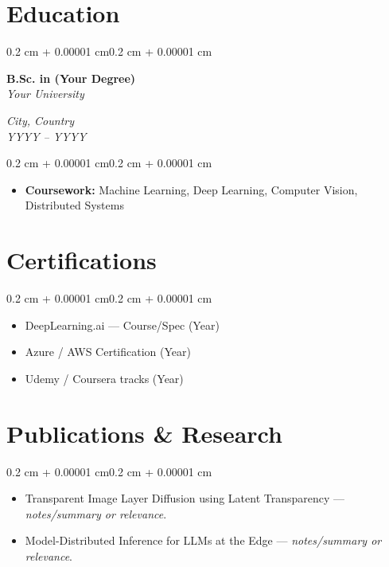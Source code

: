 \documentclass[10pt, letterpaper]{article}
\newenvironment{highlights}{
  \begin{itemize}[
    topsep=0.10 cm,
    parsep=0.10 cm,
    partopsep=0pt,
    itemsep=0pt,
    leftmargin=0.4 cm + 10pt
  ]}
  {\end{itemize}
}
\newenvironment{highlightsforbulletentries}{
  \begin{itemize}[
    topsep=0.10 cm,
    parsep=0.10 cm,
    partopsep=0pt,
    itemsep=0pt,
    leftmargin=10pt
  ]}
  {\end{itemize}
}
\newenvironment{onecolentry}{
  \begin{adjustwidth}{0.2 cm + 0.00001 cm}{0.2 cm + 0.00001 cm}
}{
  \end{adjustwidth}
}
\newenvironment{twocolentry}[2][]{
  \onecolentry
  \def\secondColumn{#2}
  \setcolumnwidth{\fill, 4.5 cm}
  \begin{paracol}{2}
}{
  \switchcolumn \raggedleft \secondColumn
  \end{paracol}
  \endonecolentry
}
\begin{document}
\section{Education}
\begin{twocolentry}{
  \textit{City, Country} \\
  \textit{YYYY -- YYYY}}
  \textbf{B.Sc. in (Your Degree)} \\
  \textit{Your University}
\end{twocolentry}
\vspace{0.10 cm}
\begin{onecolentry}
  \begin{highlights}
    \item \textbf{Coursework:} Machine Learning, Deep Learning, Computer Vision, Distributed Systems
  \end{highlights}
\end{onecolentry}

\section{Certifications}
\begin{onecolentry}
  \begin{highlightsforbulletentries}
    \item {DeepLearning.ai — Course/Spec (Year)}
    \item {Azure / AWS Certification (Year)}
    \item {Udemy / Coursera tracks (Year)}
  \end{highlightsforbulletentries}
\end{onecolentry}

\section{Publications \& Research}
\begin{onecolentry}
  \begin{highlightsforbulletentries}
    \item {Transparent Image Layer Diffusion using Latent Transparency — \textit{notes/summary or relevance}.}
    \item {Model-Distributed Inference for LLMs at the Edge — \textit{notes/summary or relevance}.}
  \end{highlightsforbulletentries}
\end{onecolentry}
\end{document}
